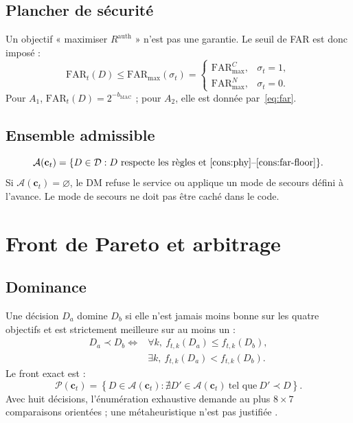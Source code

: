 \documentclass[conference,a4paper]{IEEEtran}
\newcommand{\Rauth}{R^{\mathrm{auth}}}
\newcommand{\FAR}{\mathrm{FAR}}
\begin{document}
\subsection{Plancher de sécurité}
Un objectif « maximiser $\Rauth$ » n'est pas une garantie. Le seuil de FAR est donc imposé :
\begin{equation}
\FAR_t(D)\leq
\FAR_{\max}(\sigma_t)=
\begin{cases}
\FAR_{\max}^{C}, & \sigma_t=1,\\
\FAR_{\max}^{N}, & \sigma_t=0.
\end{cases}
\label{cons:far-floor}
\end{equation}
Pour $A_1$, $\FAR_t(D)=2^{-b_{\mathrm{MAC}}}$ ; pour $A_2$, elle est donnée par~\eqref{eq:far}.

\subsection{Ensemble admissible}
\begin{equation}
\mathcal{A}(\mathbf{c}_t)=
\{D\in\mathcal{D}:D\text{ respecte les règles et }\eqref{cons:phy}\text{--}\eqref{cons:far-floor}\}.
\end{equation}
Si $\mathcal{A}(\mathbf{c}_t)=\varnothing$, le DM refuse le service ou applique un mode de secours défini à l'avance. Le mode de secours ne doit pas être caché dans le code.

\section{Front de Pareto et arbitrage}

\subsection{Dominance}
Une décision $D_a$ domine $D_b$ si elle n'est jamais moins bonne sur les quatre objectifs et est strictement meilleure sur au moins un :
\begin{equation}
\begin{aligned}
D_a\prec D_b\iff{}&
\forall k,\ f_{t,k}(D_a)\leq f_{t,k}(D_b),\\
&\exists k,\ f_{t,k}(D_a)<f_{t,k}(D_b).
\end{aligned}
\label{eq:pareto-dominance}
\end{equation}
Le front exact est :
\begin{equation}
\mathcal{P}(\mathbf{c}_t)=
\left\{D\in\mathcal{A}(\mathbf{c}_t):
\nexists D'\in\mathcal{A}(\mathbf{c}_t)\ \text{tel que}\ D'\prec D\right\}.
\end{equation}
Avec huit décisions, l'énumération exhaustive demande au plus $8\times7$ comparaisons orientées ; une métaheuristique n'est pas justifiée \cite{miettinen1999}.
\end{document}
